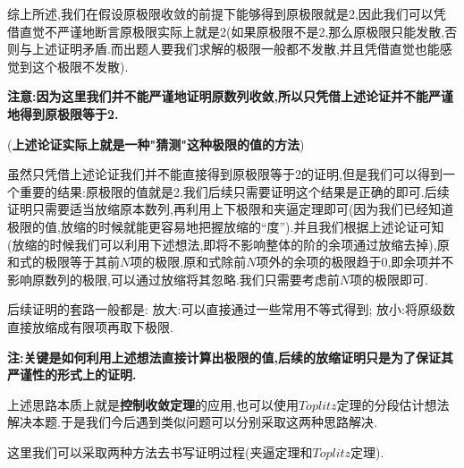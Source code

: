 \documentclass[lang=cn,newtx,10pt,scheme=chinese]{elegantbook}
\begin{document}
\begin{note}
综上所述,我们在假设原极限收敛的前提下能够得到原极限就是2,因此我们可以凭借直觉不严谨地断言原极限实际上就是2(如果原极限不是2,那么原极限只能发散,否则与上述证明矛盾.而出题人要我们求解的极限一般都不发散,并且凭借直觉也能感觉到这个极限不发散).

\textbf{注意:因为这里我们并不能严谨地证明原数列收敛,所以只凭借上述论证并不能严谨地得到原极限等于2.}

(\textbf{上述论证实际上就是一种"猜测"这种极限的值的方法})

虽然只凭借上述论证我们并不能直接得到原极限等于2的证明,但是我们可以得到一个重要的结果:原极限的值就是2.我们后续只需要证明这个结果是正确的即可.后续证明只需要适当放缩原本数列,再利用上下极限和夹逼定理即可(因为我们已经知道极限的值,放缩的时候就能更容易地把握放缩的“度”).并且我们根据上述论证可知(放缩的时候我们可以利用下述想法,即将不影响整体的阶的余项通过放缩去掉),原和式的极限等于其前$N$项的极限,原和式除前$N$项外的余项的极限趋于0,即余项并不影响原数列的极限,可以通过放缩将其忽略.我们只需要考虑前$N$项的极限即可.

后续证明的套路一般都是:
放大:可以直接通过一些常用不等式得到;
放小:将原级数直接放缩成有限项再取下极限.

\textbf{注:关键是如何利用上述想法直接计算出极限的值,后续的放缩证明只是为了保证其严谨性的形式上的证明.}
\end{note}
\begin{remark}
上述思路本质上就是\textbf{控制收敛定理}的应用,也可以使用$Toplitz$定理的分段估计想法解决本题.于是我们今后遇到类似问题可以分别采取这两种思路解决.

这里我们可以采取两种方法去书写证明过程(夹逼定理和$Toplitz$定理).
\end{remark}
\end{document}

